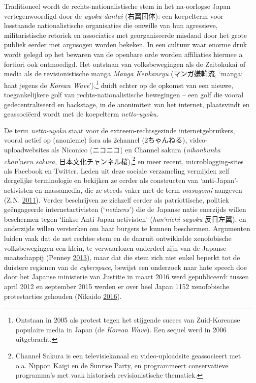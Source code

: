 \documentclass[10.5pt,dutch,]{article}
\begin{document}
Traditioneel wordt de rechts-nationalistische stem in het na-oorlogse
Japan vertegenwoordigd door de \emph{uyoku-dantai} (右翼団体): een
koepelterm voor losstaande nationalistische organisaties die omwille van
hun agressieve, militaristische retoriek en associaties met
georganiseerde misdaad door het grote publiek eerder met argusogen
worden bekeken. In een cultuur waar enorme druk wordt gelegd op het
bewaren van de openbare orde worden affiliaties hiermee a fortiori ook
ontmoedigd. Het ontstaan van volksbewegingen als de Zaitokukai of media
als de revisionistische manga \emph{Manga Kenkanryū} (マンガ嫌韓流,
`manga: haat jegens de \emph{Korean Wave}'),\footnote{Ontstaan in 2005
  als protest tegen het stijgende succes van Zuid-Koreanse populaire
  media in Japan (de \emph{Korean Wave}). Een sequel werd in 2006
  uitgebracht.} duidt echter op de opkomst van een nieuwe,
toegankelijkere golf van rechts-nationalistische bewegingen -- een golf
die vooral gedecentraliseerd en backstage, in de anonimiteit van het
internet, plaatsvindt en geassociëerd wordt met de koepelterm
\emph{netto-uyoku}.

De term \emph{netto-uyoku} staat voor de extreem-rechtsgezinde
internetgebruikers, vooral actief op (anonieme) fora als 2channel
(2ちゃんねる), video-uploadwebsites als Niconico (ニコニコ) en Channel
sakura (\emph{nihonbunka chan'neru sakura},
日本文化チャンネル桜),\footnote{Channel Sakura is een televisiekanaal en
  video-uploadsite geassocieert met o.a. Nippon Kaigi en de Sunrise
  Party, en programmeert conservatieve programma's met vaak historisch
  revisionistische thematiek.} en meer recent, microblogging-sites als
Facebook en Twitter. Leden uit deze sociale verzameling vermijden zelf
dergelijke terminologie en bekijken ze eerder als constructen van
`anti-Japan'-activisten en massamedia, die ze steeds vaker met de term
\emph{masugomi} aangeven (Z.N.
\protect\hyperlink{ref-z.n.ux5fkokuminux5f2011}{2011}). Verder
beschrijven ze zichzelf eerder als patriottische, politiek geëngageerde
internetactivisten (`\emph{netizens}') die de Japanse natie enerzijds
willen beschermen tegen `linkse Anti-Japan activisten' (\emph{han'nichi
sayoku} 反日左翼), en anderzijds willen versterken om haar burgers te
kunnen beschermen. Argumenten luiden vaak dat de net rechtse stem en de
daaruit ontwikkelde xenofobische volksbewegingen een klein, te
verwaarlozen onderdeel zijn van de Japanse maatschappij (Penney
\protect\hyperlink{ref-penneyux5fracistsux5f2013}{2013}), maar dat die
stem zich niet enkel beperkt tot de duistere regionen van de
\emph{cyberspace}, bewijst een onderzoek naar hate speech doe door het
Japanse ministerie van Justitie in maart 2016 werd gepubliceerd: tussen
april 2012 en september 2015 werden er over heel Japan 1152 xenofobische
protestacties gehouden (Nikaido
\protect\hyperlink{ref-ux5fheitosupiichiux5f2016}{2016}).
\end{document}
